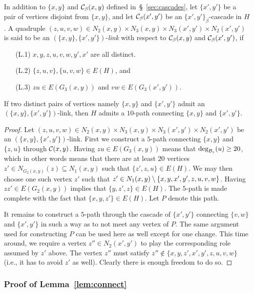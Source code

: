 \documentclass[11pt,reqno]{amsart}
\begin{document}
In addition to $\{x,y\}$ and $\mathcal{C}_\beta(x,y)$ defined in~\S~\ref{sec:cascades}, let $\{x',y'\}$ be a pair of vertices disjoint from $\{x,y\}$, and let $\mathcal{C}_\beta(x',y')$ be an $\{x',y'\}_\beta$-cascade in $H$. A quadruple  $(z,u,v,w) \in N_2(x,y) \times N_3(x,y) \times N_3(x',y') \times N_2(x',y')$ is said to be an $(\{x,y\},\{x',y'\})$-{\em link} with respect to $\mathcal{C}_\beta(x,y)$ and $\mathcal{C}_\beta(x',y')$, if  
\begin{enumerate}
	\item [(L.1)] $x,y,z,u,v,w,y',x'$ are all distinct. 
	\item [(L.2)] $\{z,u,v\}, \{u,v,w\} \in E(H)$, and 
	\item [(L.3)] $zu \in E(G_3(x,y))$ and $vw \in E(G_3(x',y'))$. 
\end{enumerate}


\begin{lemma}\label{lem:link}
If two distinct pairs of vertices namely $\{x,y\}$ and $\{x',y'\}$ admit an $(\{x,y\},\{x',y'\})$-link, then $H$ admits a $10$-path connecting $\{x,y\}$ and $\{x',y'\}$. 
\end{lemma}

\begin{proof}
Let $(z,u,v,w) \in N_2(x,y) \times N_3(x,y) \times N_3(x',y') \times N_2(x',y')$ be an $(\{x,y\},\{x',y'\})$-link. First we construct a $5$-path connecting $\{x,y\}$ and $\{z,u\}$ through $\mathcal{C}(x,y)$. Having $zu \in E(G_3(x,y))$ means that $\deg_{\mathcal{B}_z}(u) \geq 20$, which in other words means that there are at least $20$ vertices $z' \in N_{G_2(x,y)}(z) \subseteq N_1(x,y)$ such that $\{z',z,u\} \in E(H)$. We may then choose one such vertex $z'$ such that $z' \in N_1(x,y) \setminus \{x,y,x',y',z,u,v,w\}$. Having $zz' \in E(G_2(x,y))$ implies that $\{y,z',z\} \in E(H)$. The $5$-path is made complete with the fact that $\{x,y,z'\} \in E(H)$. Let $P$ denote this path. 

It remains to construct a $5$-path through the cascade of $\{x',y'\}$ connecting $\{v,w\}$ and $\{x',y'\}$ in such a way as to not meet any vertex of $P$. The same argument used for constructing $P$ can be used here as well except for one change. This time around, we require a vertex $z'' \in N_2(x',y')$ to play the corresponding role assumed by $z'$ above. The vertex $z''$ must satisfy $z'' \notin \{x,y,z',x',y',z,u,v,w\}$ (i.e., it has to avoid $z'$ as well). Clearly there is enough freedom to do so.
\end{proof}

\subsubsection{Proof of Lemma~\ref{lem:connect}}
\end{document}
